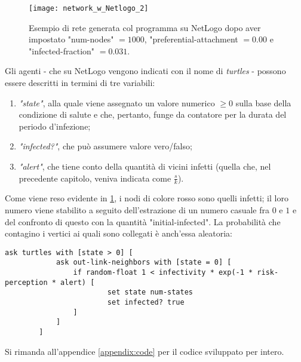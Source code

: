 \begin{figure}[t]
		\begin{center}
			\texttt{[image: network\_w\_Netlogo\_2]}
			\caption{Esempio di rete generata col programma su NetLogo dopo aver impostato "num-nodes" $= 1000 $, "preferential-attachment $= 0.00 $ e "infected-fraction" $= 0.031 $.}
			\label{fig:NetLogo1}
		\end{center}
\end{figure}
Gli agenti - che su NetLogo vengono indicati con il nome di \emph{turtles} - possono essere descritti in termini di tre variabili:
\begin{enumerate}
\item \textit{"state"}, alla quale viene assegnato un valore numerico $ \geq 0 $ sulla base della condizione di salute e che, pertanto, funge da contatore per la durata del periodo d'infezione;
\item \textit{"infected?"}, che può assumere valore vero/falso;
\item \textit{"alert"}, che tiene conto della quantità di vicini infetti (quella che, nel precedente capitolo, veniva indicata come $ \tfrac{s}{k}$).
\end{enumerate}
Come viene reso evidente in \cref{fig:NetLogo1}, i nodi di colore rosso sono quelli infetti; il loro numero viene stabilito a seguito dell'estrazione di un numero casuale fra $ 0 $ e $ 1 $ e del confronto di questo con la quantità "initial-infected". La probabilità che contagino i vertici ai quali sono collegati è anch'essa aleatoria:
\begin{center}
	\begin{lstlisting}[autogobble,language={NetLogo},caption={Porzione di codice in cui si mette in luce il meccanismo di infezione.},label={list:infection_prob}]
		ask turtles with [state > 0] [
    		ask out-link-neighbors with [state = 0] [
      			if random-float 1 < infectivity * exp(-1 * risk-perception * alert) [
        				set state num-states
        				set infected? true
      			]
    		]
  		]  
	\end{lstlisting}
\end{center}
Si rimanda all'appendice \ref{appendix:code} per il codice sviluppato per intero.
